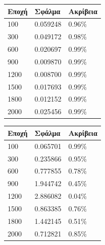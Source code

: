 \begin{center}
\begin{tabular}{|l|l|l|}
\hline
\textbf{Εποχή} & \textbf{Σφάλμα} & \textbf{Ακρίβεια} \\ \hline
100		   	   & 0.059248		 & 0.96\%            \\ \hline
300		       & 0.049172        & 0.98\%            \\ \hline
600  		   & 0.020697        & 0.99\%            \\ \hline
900	     	   & 0.009870        & 0.99\%            \\ \hline
1200		   & 0.008700        & 0.99\%            \\ \hline
1500		   & 0.017693        & 0.99\%            \\ \hline
1800		   & 0.012152        & 0.99\%            \\ \hline
2000		   & 0.025456        & 0.99\%            \\ \hline
\end{tabular}
\end{center}
 \label{tab:title}

\begin{center}
\begin{tabular}{|l|l|l|}
\hline
\textbf{Εποχή} & \textbf{Σφάλμα} & \textbf{Ακρίβεια} \\ \hline
100		   	   & 0.065701		 & 0.99\%            \\ \hline
300		       & 0.235866        & 0.95\%            \\ \hline
600  		   & 0.777855        & 0.78\%            \\ \hline
900	     	   & 1.944742        & 0.45\%            \\ \hline
1200		   & 2.886082        & 0.04\%            \\ \hline
1500		   & 0.863385        & 0.76\%            \\ \hline
1800		   & 1.442145        & 0.51\%            \\ \hline
2000		   & 0.712821        & 0.85\%            \\ \hline
\end{tabular}
\end{center}
 \label{tab:title}

